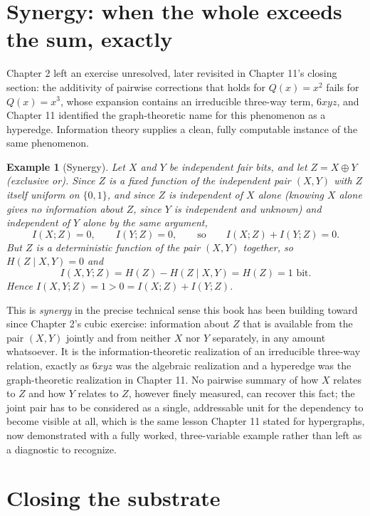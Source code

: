\documentclass[11pt]{book}
\newtheorem{example}[theorem]{Example}
\begin{document}
\section{Synergy: when the whole exceeds the sum, exactly}

Chapter 2 left an exercise unresolved, later revisited in Chapter 11's closing section: the additivity of pairwise corrections that holds for $Q(x)=x^2$ fails for $Q(x)=x^3$, whose expansion contains an irreducible three-way term, $6xyz$, and Chapter 11 identified the graph-theoretic name for this phenomenon as a hyperedge. Information theory supplies a clean, fully computable instance of the same phenomenon.

\begin{example}[Synergy]
\label{ex:synergy}
Let $X$ and $Y$ be independent fair bits, and let $Z=X\oplus Y$ (exclusive or). Since $Z$ is a fixed function of the independent pair $(X,Y)$ with $Z$ itself uniform on $\{0,1\}$, and since $Z$ is independent of $X$ alone (knowing $X$ alone gives no information about $Z$, since $Y$ is independent and unknown) and independent of $Y$ alone by the same argument,
\[
I(X;Z) = 0, \qquad I(Y;Z) = 0, \qquad\text{so}\qquad I(X;Z)+I(Y;Z) = 0.
\]
But $Z$ is a deterministic function of the pair $(X,Y)$ together, so $H(Z\mid X,Y)=0$ and
\[
I(X,Y;Z) = H(Z) - H(Z\mid X,Y) = H(Z) = 1 \text{ bit}.
\]
Hence $I(X,Y;Z) = 1 > 0 = I(X;Z)+I(Y;Z)$.
\end{example}

This is \emph{synergy} in the precise technical sense this book has been building toward since Chapter 2's cubic exercise: information about $Z$ that is available from the pair $(X,Y)$ jointly and from neither $X$ nor $Y$ separately, in any amount whatsoever. It is the information-theoretic realization of an irreducible three-way relation, exactly as $6xyz$ was the algebraic realization and a hyperedge was the graph-theoretic realization in Chapter 11. No pairwise summary of how $X$ relates to $Z$ and how $Y$ relates to $Z$, however finely measured, can recover this fact; the joint pair has to be considered as a single, addressable unit for the dependency to become visible at all, which is the same lesson Chapter 11 stated for hypergraphs, now demonstrated with a fully worked, three-variable example rather than left as a diagnostic to recognize.

\section{Closing the substrate}
\end{document}
